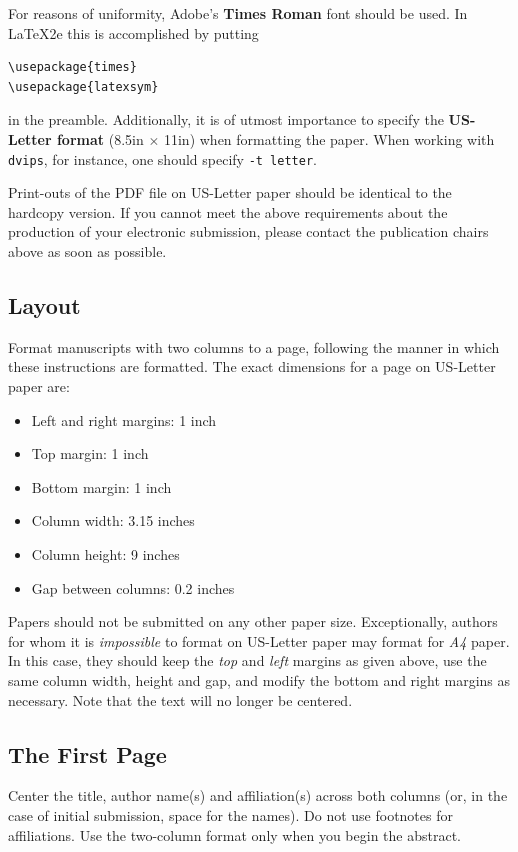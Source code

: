 \documentclass{article}
\begin{document}
For reasons of uniformity, Adobe's {\bf Times Roman} font should be
used. In \LaTeX2e{} this is accomplished by putting
\small
\begin{verbatim}
\usepackage{times}
\usepackage{latexsym}
\end{verbatim}
\normalsize
in the preamble.
Additionally, it is of utmost importance to specify the {\bf
  US-Letter format} (8.5in $\times$ 11in) when formatting the paper.
When working with {\small\tt dvips}, for instance, one should specify {\small\tt -t letter}.

Print-outs of the PDF file on US-Letter paper should be identical to the
hardcopy version.  If you cannot meet the above requirements about the
production of your electronic submission, please contact the
publication chairs above  as soon as possible.

\subsection{Layout}
\label{ssec:layout}

Format manuscripts with two columns to a page, following the manner in which these
instructions are formatted. The exact dimensions for a page on US-Letter paper are:

\begin{itemize}
\item Left and right margins: 1 inch
\item Top margin: 1 inch
\item Bottom margin: 1 inch
\item Column width: 3.15 inches
\item Column height: 9 inches
\item Gap between columns: 0.2 inches
\end{itemize}

\noindent Papers should not be submitted on any other paper size. Exceptionally,
authors for whom it is \emph{impossible} to format on US-Letter paper 
may format for \emph{A4} paper. In this case, they should keep the \emph{top}
and \emph{left} margins as given above, use the same column width,
height and gap, and modify the bottom and right margins as necessary.
Note that the text will no longer be centered.

\subsection{The First Page}
\label{ssec:first}

Center the title, author name(s) and affiliation(s) across both
columns (or, in the case of initial submission, space for the names). 
Do not use footnotes for affiliations.  
Use the two-column format only when you begin the abstract.
\end{document}
